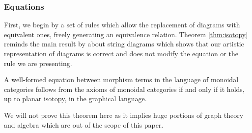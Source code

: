 \documentclass[math, english, info]{cours}
\begin{document}
\subsubsection{Equations}
\label{subsubsec:sdq}
First, we begin by a set of rules which allow the replacement of diagrams with equivalent ones, freely generating an equivalence relation.
Theorem \ref{thm:isotopy} reminds the main result by  about string diagrams which shows that our artistic representation of diagrams is correct and does not modify the equation or the rule we are presenting.
\begin{thm}
	\label{thm:isotopy}
	A well-formed equation between morphism terms in the language of monoidal categories follows from the axioms of monoidal categories if and only if it holds, up to planar isotopy, in the graphical language.
\end{thm}
We will not prove this theorem here as it implies huge portions of graph theory and algebra which are out of the scope of this paper.

\medskip
\end{document}
